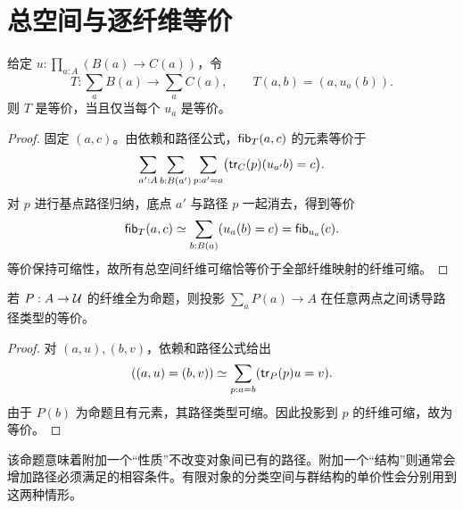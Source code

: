 \section{总空间与逐纤维等价}
\begin{theorem}[总空间等价判据]\label{thm:fiberwise}
给定 $u:\prod_{a:A}(B(a)\to C(a))$，令
\[
T:\sum_aB(a)\to\sum_aC(a),\qquad T(a,b)=(a,u_a(b)).
\]
则 $T$ 是等价，当且仅当每个 $u_a$ 是等价。
\end{theorem}
\begin{proof}
固定 $(a,c)$。由依赖和路径公式，$\mathsf{fib}_T(a,c)$ 的元素等价于
\[
\sum_{a':A}\sum_{b:B(a')}\sum_{p:a'=a}
\bigl(\mathsf{tr}_C(p)(u_{a'}b)=c\bigr).
\]
对 $p$ 进行基点路径归纳，底点 $a'$ 与路径 $p$ 一起消去，得到等价
\[
\mathsf{fib}_T(a,c)\simeq\sum_{b:B(a)}(u_a(b)=c)=\mathsf{fib}_{u_a}(c).
\]
等价保持可缩性，故所有总空间纤维可缩恰等价于全部纤维映射的纤维可缩。
\end{proof}
\begin{proposition}[命题子类型中的路径]
若 $P:A\to\mathcal U$ 的纤维全为命题，则投影 $\sum_aP(a)\to A$ 在任意两点之间诱导路径类型的等价。
\end{proposition}
\begin{proof}
对 $(a,u),(b,v)$，依赖和路径公式给出
\[
((a,u)=(b,v))\simeq\sum_{p:a=b}(\mathsf{tr}_P(p)u=v).
\]
由于 $P(b)$ 为命题且有元素，其路径类型可缩。因此投影到 $p$ 的纤维可缩，故为等价。
\end{proof}
\begin{remark}
该命题意味着附加一个“性质”不改变对象间已有的路径。附加一个“结构”则通常会增加路径必须满足的相容条件。有限对象的分类空间与群结构的单价性会分别用到这两种情形。
\end{remark}
